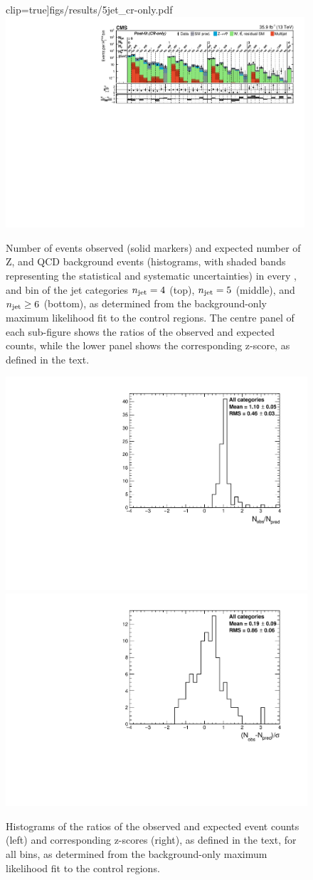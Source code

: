 \begin{figure}[!p]
clip=true]{figs/results/5jet_cr-only.pdf}\\
\includegraphics[width=0.99\textwidth, trim=0 0 0 0, 
clip=true]{figs/results/6jet_cr-only.pdf}\\
\caption{Number of events observed (solid markers) and expected number of Z, 
\ttw and QCD background events (histograms, with shaded bands representing the 
statistical and systematic uncertainties) in every \nb, \scalht and \mht bin of 
the jet categories $n_{\text{jet}} = 4$ (top), $n_{\text{jet}}=5$ (middle), and $n_{\text{jet}}\ge6$ 
(bottom), as determined from the background-only maximum likelihood fit to the 
control regions. 
The centre panel of each sub-figure shows the ratios of the observed and 
expected counts, while the lower panel shows the corresponding z-score, as 
defined in the text.}
\label{fig:results2}
\end{figure}

\begin{figure}[h!]
\centering
\includegraphics[width=0.49\linewidth]{figs/results/ratios_all_prefit.pdf}
\includegraphics[width=0.49\linewidth]{figs/results/pulls_all_prefit.pdf}
\caption{Histograms of the ratios of the observed and expected event counts 
(left) and corresponding z-scores (right), as defined in the text, for all 
\njnbht bins, as determined from the background-only maximum likelihood fit to 
the control regions.}
\label{fig:ratios_and_pulls}
\end{figure}

